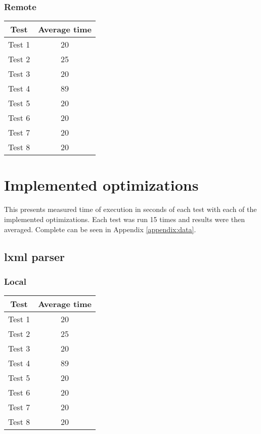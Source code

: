 \subsubsection{Remote}
\begin{center}
    \begin{tabular}{| c | c |}
    \hline
    Test & Average time \\ \hline
    Test 1 & 20 \\ \hline
    Test 2 & 25 \\ \hline
    Test 3 & 20 \\ \hline
    Test 4 & 89 \\ \hline
    Test 5 & 20 \\ \hline
    Test 6 & 20 \\ \hline
    Test 7 & 20 \\ \hline
    Test 8 & 20 \\ \hline
    \end{tabular}
\end{center}


\section{Implemented optimizations}
This presents measured time of execution in seconds of each test with each of the implemented optimizations. Each test was run 15 times and results were then averaged. Complete can be seen in Appendix \ref{appendix:data}.
\subsection{lxml parser}
\subsubsection{Local}
\begin{center}
    \begin{tabular}{| c | c |}
    \hline
    Test & Average time \\ \hline
    Test 1 & 20 \\ \hline
    Test 2 & 25 \\ \hline
    Test 3 & 20 \\ \hline
    Test 4 & 89 \\ \hline
    Test 5 & 20 \\ \hline
    Test 6 & 20 \\ \hline
    Test 7 & 20 \\ \hline
    Test 8 & 20 \\ \hline
    \end{tabular}
\end{center}
